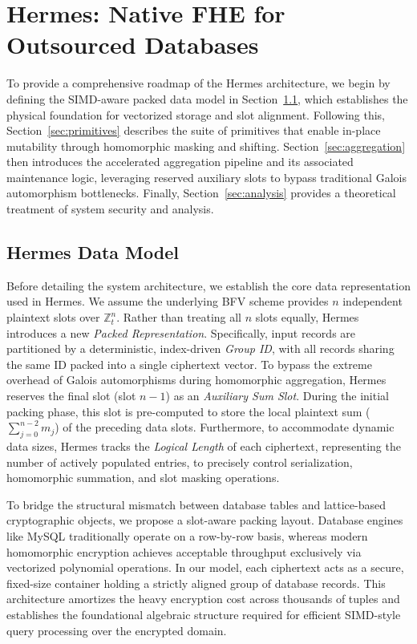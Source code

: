 \documentclass[sigconf,nonacm]{acmart}
\begin{document}
\section{Hermes: Native FHE for Outsourced Databases}

To provide a comprehensive roadmap of the Hermes architecture, we begin by defining the SIMD-aware packed data model in Section~\ref{sec:datamodel}, which establishes the physical foundation for vectorized storage and slot alignment. Following this, Section~\ref{sec:primitives} describes the suite of primitives that enable in-place mutability through homomorphic masking and shifting. Section~\ref{sec:aggregation} then introduces the accelerated aggregation pipeline and its associated maintenance logic, leveraging reserved auxiliary slots to bypass traditional Galois automorphism bottlenecks. Finally, Section~\ref{sec:analysis} provides a theoretical treatment of system security and analysis.

\subsection{Hermes Data Model}
\label{sec:datamodel}

Before detailing the system architecture, we establish the core data representation used in Hermes. We assume the underlying BFV scheme provides $n$ independent plaintext slots over $\mathbb{Z}_t^n$. Rather than treating all $n$ slots equally, Hermes introduces a new \emph{Packed Representation}. 
Specifically, input records are partitioned by a deterministic, index-driven \emph{Group ID}, with all records sharing the same ID packed into a single ciphertext vector. To bypass the extreme overhead of Galois automorphisms during homomorphic aggregation, Hermes reserves the final slot (slot $n-1$) as an \emph{Auxiliary Sum Slot}. During the initial packing phase, this slot is pre-computed to store the local plaintext sum ($\sum_{j=0}^{n-2} m_j$) of the preceding data slots. Furthermore, to accommodate dynamic data sizes, Hermes tracks the \emph{Logical Length} of each ciphertext, representing the number of actively populated entries, to precisely control serialization, homomorphic summation, and slot masking operations.

To bridge the structural mismatch between database tables and lattice-based cryptographic objects, we propose a slot-aware packing layout. Database engines like MySQL traditionally operate on a row-by-row basis, whereas modern homomorphic encryption achieves acceptable throughput exclusively via vectorized polynomial operations. In our model, each ciphertext acts as a secure, fixed-size container holding a strictly aligned group of database records. This architecture amortizes the heavy encryption cost across thousands of tuples and establishes the foundational algebraic structure required for efficient SIMD-style query processing over the encrypted domain.
\end{document}
